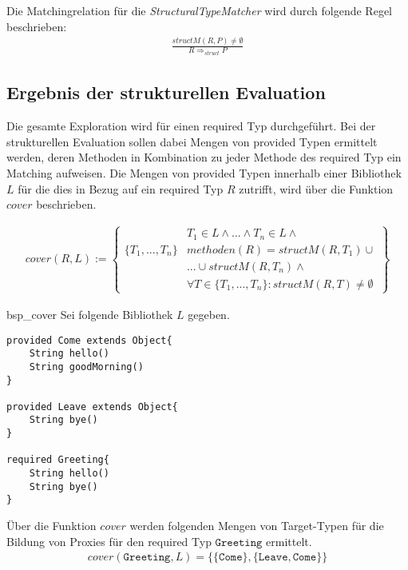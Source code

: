 Die Matchingrelation für die \emph{StructuralTypeMatcher} wird durch folgende Regel beschrieben:
\begin{gather*}
\frac{structM(R,P) \neq \emptyset}{R \Rightarrow_{struct}P}
\end{gather*}


\subsection{Ergebnis der strukturellen Evaluation}\label{sec_ergStructEval}
Die gesamte Exploration wird für einen required Typ durchgeführt. Bei der strukturellen Evaluation sollen dabei Mengen von provided Typen ermittelt werden, deren Methoden in Kombination zu jeder Methode des required Typ ein Matching aufweisen. Die Mengen von provided Typen innerhalb einer Bibliothek $L$ für die dies in Bezug auf ein required Typ $R$ zutrifft, wird über die Funktion $cover$ beschrieben.

\begin{gather*}
cover(R,L) := 
\left\{\begin{array}{l|l}
					& T_1 \in L \wedge \text{...} \wedge T_n \in L 								\wedge \mathit{ }\\
\{T_1,...,T_n\}		& \mathit{methoden(R)} = \mathit{structM(R,T_1)}							\cup \mathit{ }\\
					& \texttt{...} \cup \mathit{structM(R, T_n)} 								\wedge \mathit{ }\\
					& \forall T \in \{T_1,...,T_n\}:											\mathit{structM(R,T)} \neq \emptyset
\end{array}\right\}
\end{gather*}

\begin{example}{bsp_cover}
Sei folgende Bibliothek $L$ gegeben.
\begin{lstlisting}[style = dsl]
provided Come extends Object{
	String hello()
	String goodMorning()
}

provided Leave extends Object{
	String bye()
}

required Greeting{
	String hello()
	String bye()
}
\end{lstlisting}
Über die Funktion $\mathit{cover}$ werden folgenden Mengen von Target-Typen für die Bildung von Proxies für den required Typ $\texttt{Greeting}$ ermittelt.
\begin{gather*}
\mathit{cover(\texttt{Greeting},L)} = \{
	\{\texttt{Come}\},\{\texttt{Leave}, \texttt{Come}\}
\}
\end{gather*}
\end{example}

